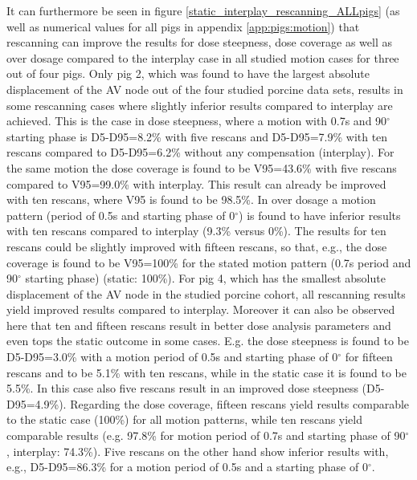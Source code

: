 It can furthermore be seen in figure \ref{static_interplay_rescanning_ALLpigs} (as well as numerical values for all pigs in appendix \ref{app:pigs:motion}) 
that rescanning can improve the results for dose steepness, dose coverage as well as over dosage compared to the interplay case in all studied 
motion cases for three out of four pigs. Only pig 2, which was found to have the largest absolute displacement of the AV node out of the four 
studied porcine data sets, results in some rescanning cases where slightly inferior results compared to interplay are achieved. This is the 
case in dose steepness, where a motion with 0.7s and 90$^{\circ}$ starting phase is D5-D95=8.2\% with five rescans and D5-D95=7.9\% 
with ten rescans compared to D5-D95=6.2\% without any compensation (interplay). For the same motion the dose coverage is found to be V95=43.6\% 
with five rescans compared to V95=99.0\% with interplay. This result can already be improved with ten rescans, where V95 is found to be 98.5\%.  
In over dosage a motion pattern (period of 0.5s and starting phase of 0$^{\circ}$) is found to have inferior results with ten rescans compared 
to interplay (9.3\% versus 0\%). The results for ten rescans could be slightly improved with fifteen rescans, so that, e.g., 
the dose coverage is found to be V95=100\% for the stated motion pattern (0.7s period and 90$^{\circ}$ starting phase) (static: 100\%). 
For pig 4, which has the smallest absolute displacement of the AV node in the studied porcine cohort, all rescanning results yield 
improved results compared to interplay. Moreover it can also be observed here that ten and fifteen rescans result in better dose analysis 
parameters and even tops the static outcome in some cases. E.g. the dose steepness is found to be D5-D95=3.0\% with a motion period of 0.5s 
and starting phase of 0$^{\circ}$ for fifteen rescans and to be 5.1\% with ten rescans, while in the static case it is found to be 5.5\%. 
In this case also five rescans result in an improved dose steepness (D5-D95=4.9\%). 
Regarding the dose coverage, fifteen rescans yield results comparable to the static case (100\%) for all motion patterns, while ten rescans 
yield comparable results (e.g. 97.8\% for motion period of 0.7s and starting phase of 90$^{\circ}$, interplay: 74.3\%). Five rescans 
on the other hand show inferior results with, e.g., D5-D95=86.3\% for a motion period of 0.5s and a starting phase of 0$^{\circ}$.\newline  

\newpage

\vspace*{0.8cm}

